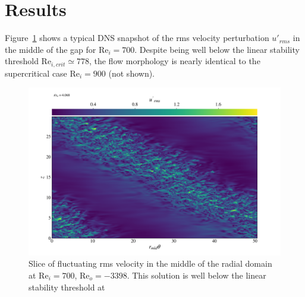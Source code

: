 \documentclass[openacc]{rstransa}%
\newcommand{\Reyn}{\mathrm{Re}}
\begin{document}
\section{Results}
\label{sec:nonlinear}
Figure~\ref{fig:urms_tz_rei700} shows a typical DNS snapshot of the rms velocity perturbation $u'_{rms}$ in the middle of the gap for $\Reyn_i=700$. Despite being well below the linear stability threshold $\Reyn_{i,crit} \simeq 778$, the flow morphology is nearly identical to the supercritical case $\Reyn_i = 900$ (not shown). 
\begin{figure}
    \centering
    \includegraphics[width=\textwidth]{../figs/urms_tz_rei_700_reo-3398_000278.png}
    \caption{Slice of fluctuating rms velocity in the middle of the radial domain at $\Reyn_i = 700$, $\Reyn_o = -3398$. This solution is well below the linear stability threshold at }
    \label{fig:urms_tz_rei700}
\end{figure}
\end{document}
